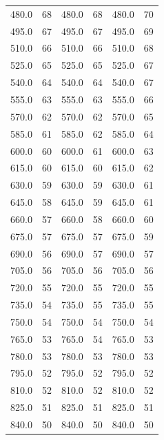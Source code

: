 \documentclass[12pt, a4paper]{article}
\begin{document}
\begin{center}
\begin{longtable}{| c | c | c | c | c | c |}
480.0 & 68  & 480.0 & 68  & 480.0 & 70  \\
495.0 & 67  & 495.0 & 67  & 495.0 & 69  \\
510.0 & 66  & 510.0 & 66  & 510.0 & 68  \\
525.0 & 65  & 525.0 & 65  & 525.0 & 67  \\
540.0 & 64  & 540.0 & 64  & 540.0 & 67  \\
555.0 & 63  & 555.0 & 63  & 555.0 & 66  \\
570.0 & 62  & 570.0 & 62  & 570.0 & 65  \\
585.0 & 61  & 585.0 & 62  & 585.0 & 64  \\
600.0 & 60  & 600.0 & 61  & 600.0 & 63  \\
615.0 & 60  & 615.0 & 60  & 615.0 & 62  \\
630.0 & 59  & 630.0 & 59  & 630.0 & 61  \\
645.0 & 58  & 645.0 & 59  & 645.0 & 61  \\
660.0 & 57  & 660.0 & 58  & 660.0 & 60  \\
675.0 & 57  & 675.0 & 57  & 675.0 & 59  \\
690.0 & 56  & 690.0 & 57  & 690.0 & 57  \\
705.0 & 56  & 705.0 & 56  & 705.0 & 56  \\
720.0 & 55  & 720.0 & 55  & 720.0 & 55  \\
735.0 & 54  & 735.0 & 55  & 735.0 & 55  \\
750.0 & 54  & 750.0 & 54  & 750.0 & 54  \\
765.0 & 53  & 765.0 & 54  & 765.0 & 53  \\
780.0 & 53  & 780.0 & 53  & 780.0 & 53  \\
795.0 & 52  & 795.0 & 52  & 795.0 & 52  \\
810.0 & 52  & 810.0 & 52  & 810.0 & 52  \\
825.0 & 51  & 825.0 & 51  & 825.0 & 51  \\
840.0 & 50  & 840.0 & 50  & 840.0 & 50  \\
\end{longtable}
\end{center}
\end{document}
